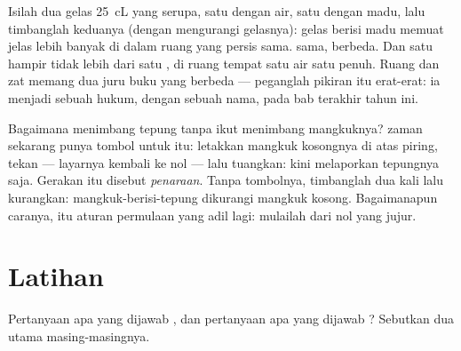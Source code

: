 \begin{example}\label{ex:g6:mass-and-volume:different}
Isilah dua gelas \qty{25}{cL} yang serupa, satu dengan air, satu
dengan madu, lalu timbanglah keduanya (dengan mengurangi 
gelasnya): gelas berisi madu memuat jelas lebih banyak  di dalam
ruang yang persis sama.  sama,  berbeda. Dan satu 
  hampir tidak lebih dari satu , di ruang tempat satu
 air  satu  penuh. Ruang dan zat memang dua juru
buku yang berbeda --- peganglah pikiran itu erat-erat: ia menjadi
sebuah hukum, dengan sebuah nama, pada bab terakhir tahun ini.
\end{example}

\begin{remark}\label{rem:g6:mass-and-volume:tare}
Bagaimana menimbang tepung tanpa ikut menimbang mangkuknya? 
zaman sekarang punya tombol untuk itu: letakkan mangkuk kosongnya di
atas piring, tekan --- layarnya kembali ke nol --- lalu tuangkan:
 kini melaporkan tepungnya saja. Gerakan itu disebut
\emph{penaraan}. Tanpa tombolnya, timbanglah dua kali lalu kurangkan:
mangkuk-berisi-tepung dikurangi mangkuk kosong. Bagaimanapun caranya,
itu aturan permulaan yang adil lagi: mulailah dari nol yang jujur.
\end{remark}

\section{Latihan}

\begin{exercise}[$\star$]\label{exo:g6:mass-and-volume:1}
Pertanyaan apa yang dijawab , dan pertanyaan apa yang dijawab
? Sebutkan dua  utama masing-masingnya.
\end{exercise}

